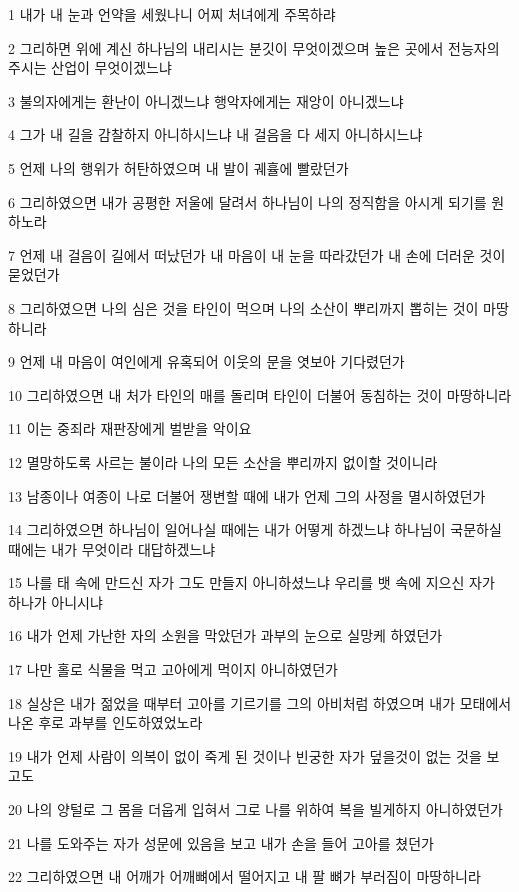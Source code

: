 \par 1 내가 내 눈과 언약을 세웠나니 어찌 처녀에게 주목하랴
\par 2 그리하면 위에 계신 하나님의 내리시는 분깃이 무엇이겠으며 높은 곳에서 전능자의 주시는 산업이 무엇이겠느냐
\par 3 불의자에게는 환난이 아니겠느냐 행악자에게는 재앙이 아니겠느냐
\par 4 그가 내 길을 감찰하지 아니하시느냐 내 걸음을 다 세지 아니하시느냐
\par 5 언제 나의 행위가 허탄하였으며 내 발이 궤휼에 빨랐던가
\par 6 그리하였으면 내가 공평한 저울에 달려서 하나님이 나의 정직함을 아시게 되기를 원하노라
\par 7 언제 내 걸음이 길에서 떠났던가 내 마음이 내 눈을 따라갔던가 내 손에 더러운 것이 묻었던가
\par 8 그리하였으면 나의 심은 것을 타인이 먹으며 나의 소산이 뿌리까지 뽑히는 것이 마땅하니라
\par 9 언제 내 마음이 여인에게 유혹되어 이웃의 문을 엿보아 기다렸던가
\par 10 그리하였으면 내 처가 타인의 매를 돌리며 타인이 더불어 동침하는 것이 마땅하니라
\par 11 이는 중죄라 재판장에게 벌받을 악이요
\par 12 멸망하도록 사르는 불이라 나의 모든 소산을 뿌리까지 없이할 것이니라
\par 13 남종이나 여종이 나로 더불어 쟁변할 때에 내가 언제 그의 사정을 멸시하였던가
\par 14 그리하였으면 하나님이 일어나실 때에는 내가 어떻게 하겠느냐 하나님이 국문하실 때에는 내가 무엇이라 대답하겠느냐
\par 15 나를 태 속에 만드신 자가 그도 만들지 아니하셨느냐 우리를 뱃 속에 지으신 자가 하나가 아니시냐
\par 16 내가 언제 가난한 자의 소원을 막았던가 과부의 눈으로 실망케 하였던가
\par 17 나만 홀로 식물을 먹고 고아에게 먹이지 아니하였던가
\par 18 실상은 내가 젊었을 때부터 고아를 기르기를 그의 아비처럼 하였으며 내가 모태에서 나온 후로 과부를 인도하였었노라
\par 19 내가 언제 사람이 의복이 없이 죽게 된 것이나 빈궁한 자가 덮을것이 없는 것을 보고도
\par 20 나의 양털로 그 몸을 더웁게 입혀서 그로 나를 위하여 복을 빌게하지 아니하였던가
\par 21 나를 도와주는 자가 성문에 있음을 보고 내가 손을 들어 고아를 쳤던가
\par 22 그리하였으면 내 어깨가 어깨뼈에서 떨어지고 내 팔 뼈가 부러짐이 마땅하니라
